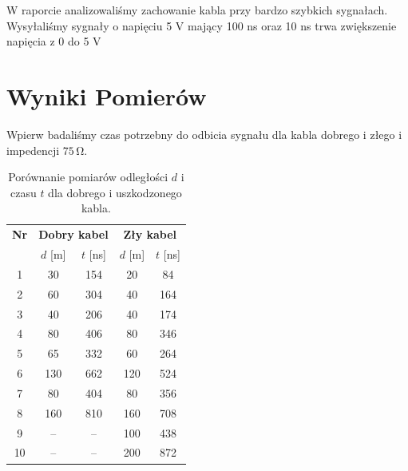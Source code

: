 \documentclass[12pt]{article}
\title{}
\author{Kacper Kłos}
\begin{document}
\maketitle

W raporcie analizowaliśmy zachowanie kabla przy bardzo szybkich sygnałach. Wysyłaliśmy sygnały o napięciu 5 V mający 100 ns oraz 10 ns trwa zwiększenie napięcia z 0 do 5 V

\newpage


\section{Wyniki Pomierów}
Wpierw badaliśmy czas potrzebny do odbicia sygnału dla kabla dobrego i złego i impedencji \(75 \, \mathrm{\Omega}\).

\begin{table}[H]
    \centering
    \begin{tabular}{c|cc|cc}
        \toprule
        \textbf{Nr} & \multicolumn{2}{c|}{\textbf{Dobry kabel}} & \multicolumn{2}{c}{\textbf{Zły kabel}} \\
        & $d$ [m] & $t$ [ns] & $d$ [m] & $t$ [ns] \\
        \midrule
        1  & 30  & 154 & 20  & 84 \\
        2  & 60  & 304 & 40  & 164 \\
        3  & 40  & 206 & 40  & 174 \\
        4  & 80  & 406 & 80  & 346 \\
        5  & 65  & 332 & 60  & 264 \\
        6  & 130 & 662 & 120 & 524 \\
        7  & 80  & 404 & 80  & 356 \\
        8  & 160 & 810 & 160 & 708 \\
        9  & --  & --      & 100 & 438 \\
        10 & --  & --      & 200 & 872 \\
        \bottomrule
    \end{tabular}
    \caption{Porównanie pomiarów odległości $d$ i czasu $t$ dla dobrego i uszkodzonego kabla.}
    \label{tab:good_vs_bad_cable}
\end{table}
\end{document}
